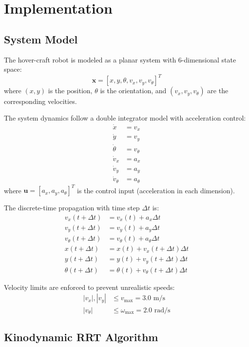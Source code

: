 \documentclass[11pt]{article}
\begin{document}
\section{Implementation}

\subsection{System Model}

The hover-craft robot is modeled as a planar system with 6-dimensional state space:
\begin{equation}
\mathbf{x} = [x, y, \theta, v_x, v_y, v_\theta]^T
\end{equation}
where $(x, y)$ is the position, $\theta$ is the orientation, and $(v_x, v_y, v_\theta)$ are the corresponding velocities.

The system dynamics follow a double integrator model with acceleration control:
\begin{align}
\dot{x} &= v_x \\
\dot{y} &= v_y \\
\dot{\theta} &= v_\theta \\
\dot{v}_x &= a_x \\
\dot{v}_y &= a_y \\
\dot{v}_\theta &= a_\theta
\end{align}
where $\mathbf{u} = [a_x, a_y, a_\theta]^T$ is the control input (acceleration in each dimension).

The discrete-time propagation with time step $\Delta t$ is:
\begin{align}
v_x(t+\Delta t) &= v_x(t) + a_x \Delta t \\
v_y(t+\Delta t) &= v_y(t) + a_y \Delta t \\
v_\theta(t+\Delta t) &= v_\theta(t) + a_\theta \Delta t \\
x(t+\Delta t) &= x(t) + v_x(t+\Delta t) \Delta t \\
y(t+\Delta t) &= y(t) + v_y(t+\Delta t) \Delta t \\
\theta(t+\Delta t) &= \theta(t) + v_\theta(t+\Delta t) \Delta t
\end{align}

Velocity limits are enforced to prevent unrealistic speeds:
\begin{align}
|v_x|, |v_y| &\leq v_{\max} = 3.0 \text{ m/s} \\
|v_\theta| &\leq \omega_{\max} = 2.0 \text{ rad/s}
\end{align}

\subsection{Kinodynamic RRT Algorithm}
\end{document}
